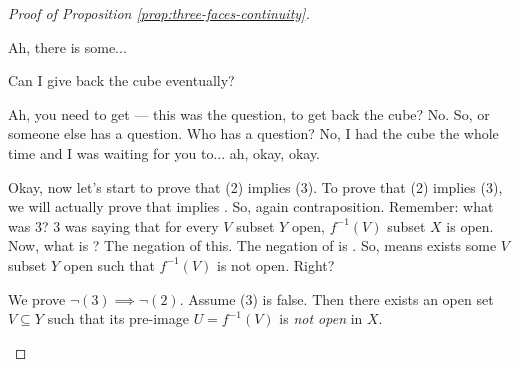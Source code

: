 \begin{proof}[Proof of Proposition \ref{prop:three-faces-continuity}]
\begin{spoken-clean}[00:24:26 - 00:24:53]
 Ah, there is some... 
\end{spoken-clean}

\begin{student-interaction}
Can I give back the cube eventually?
\end{student-interaction}

\begin{spoken-clean}[continued]
 Ah, you need to get --- this was the question, to get back the cube? No. So, or someone else has a question. Who has a question? No, I had the cube the whole time and I was waiting for you to... ah, okay, okay.
\end{spoken-clean}

\begin{spoken-clean}[00:24:53 - 00:26:13]
Okay, now let's start to prove that (2) implies (3). To prove that (2) implies (3), we will actually prove that  implies . So, again contraposition. Remember: what was 3? 3 was saying that for every $V$ subset $Y$ open, $f^{-1}(V)$ subset $X$ is open. Now, what is ? The negation of this. The negation of  is . So,  means exists some $V$ subset $Y$ open such that $f^{-1}(V)$ is not open. Right?
\end{spoken-clean}

\begin{math-stroke}[Forward Implication \texorpdfstring{$(2) \implies (3)$}{(2) => (3)} (via Contraposition)]
\begin{ai-proof-skeleton-invisible-content}
\end{ai-proof-skeleton-invisible-content}
We prove $\neg (3) \implies \neg (2)$.
Assume (3) is false. Then there exists an open set $V \subseteq Y$ such that its pre-image $U = f^{-1}(V)$ is \emph{not open} in $X$.
\end{math-stroke}


\end{proof}
